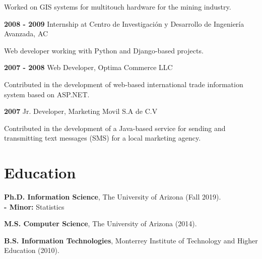 \documentclass[letterpaper]{article}
\renewenvironment{itemize}{
  \begin{list}{}{
    \setlength{\leftmargin}{1.5em}
  }
}{
  \end{list}
}
\begin{document}
\begin{itemize}
\begin{itemize}
\item Worked on GIS systems for multitouch hardware for the mining industry.
\end{itemize}
\item \textbf{2008 - 2009} Internship at {\small Centro de Investigaci\'{o}n y Desarrollo de Ingenier\'{i}a Avanzada, AC}
\item \begin{itemize}
\item Web developer working with Python and Django-based projects.
\end{itemize}
\item \textbf{2007 - 2008} Web Developer, Optima Commerce LLC
\item \begin{itemize}
\item Contributed in the development of web-based international trade information system based on ASP.NET.
\end{itemize}
\item \textbf{2007} Jr. Developer, Marketing Movil S.A de C.V
\item \begin{itemize}
\item Contributed in the development of a Java-based service for sending and transmitting text messages (SMS) for a local marketing agency.
\end{itemize}
\end{itemize}

\section*{Education}

\begin{itemize}
  \item \textbf{Ph.D. Information Science}, The University of Arizona (Fall 2019). \\
     \textbf{- Minor:} Statistics
  \item \textbf{M.S. Computer Science}, The University of Arizona (2014).
  \item \textbf{B.S. Information Technologies}, Monterrey Institute of Technology and Higher Education (2010).
\end{itemize}


\end{document}
